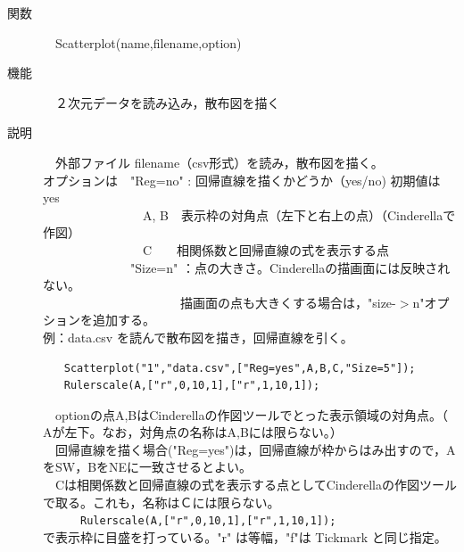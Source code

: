 \documentclass[papersize,a4paper,12pt,uplatex]{jsarticle}
\begin{document}
\begin{description}
\hypertarget{scatterplot}{}
\item[関数]　Scatterplot(name,filename,option)
\item[機能]　２次元データを読み込み，散布図を描く
\item[説明]　外部ファイル filename（csv形式）を読み，散布図を描く。\\
オプションは　"Reg=no" : 回帰直線を描くかどうか（yes/no) 初期値は yes\\
　　　　　　　　A, B　表示枠の対角点（左下と右上の点）（Cinderellaで作図）\\
　　　　　　　　C　　相関係数と回帰直線の式を表示する点\\
　　　　　　　"Size=n"  ：点の大きさ。Cinderellaの描画面には反映されない。\\
　　　　　　　　　　　描画面の点も大きくする場合は，"size-$>$n"オプションを追加する。\\
例：data.csv を読んで散布図を描き，回帰直線を引く。
\begin{verbatim}
　　Scatterplot("1","data.csv",["Reg=yes",A,B,C,"Size=5"]);
　　Rulerscale(A,["r",0,10,1],["r",1,10,1]);
\end{verbatim}
　optionの点A,BはCinderellaの作図ツールでとった表示領域の対角点。（ Aが左下。なお，対角点の名称はA,Bには限らない。）\\
　回帰直線を描く場合("Reg=yes")は，回帰直線が枠からはみ出すので，AをSW，BをNEに一致させるとよい。\\
　Cは相関係数と回帰直線の式を表示する点としてCinderellaの作図ツールで取る。これも，名称はＣには限らない。\\
　　　\verb|Rulerscale(A,["r",0,10,1],["r",1,10,1]);|\\
 で表示枠に目盛を打っている。"r" は等幅，"f"は Tickmark  と同じ指定。\\
　\\
　　　　　\\
\end{description}
\newpage

\end{document}
